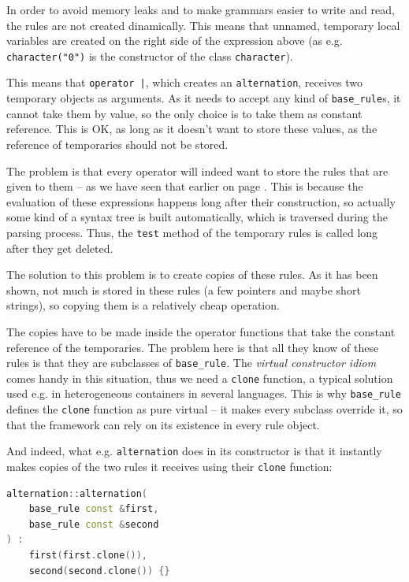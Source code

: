 \documentclass[12pt]{article}
\begin{document}
In order to avoid memory leaks and to make grammars easier to write and read, the rules are not created
dinamically. This means that unnamed, temporary local variables are created on the right side of the
expression above (as e.g. \texttt{character("0")} is the constructor of the class \texttt{character}).

This means that \texttt{operator |}, which creates an \texttt{alternation}, receives two temporary objects as
arguments. As it needs to accept any kind of \texttt{base\_rule}s, it cannot take them by value, so the only
choice is to take them as constant reference. This is OK, as long as it doesn't want to store these values, as
the reference of temporaries should not be stored.

The problem is that every operator will indeed want to store the rules that are given to them -- as we have
seen that earlier on page \pageref{subsec:ebnfoperators}. This is because the evaluation of these expressions
happens long after their construction, so actually some kind of a syntax tree is built automatically, which is
traversed during the parsing process. Thus, the \texttt{test} method of the temporary rules is called long
after they get deleted.

The solution to this problem is to create copies of these rules. As it has been shown, not much is stored in
these rules (a few pointers and maybe short strings), so copying them is a relatively cheap operation.

The copies have to be made inside the operator functions that take the constant reference of the temporaries.
The problem here is that all they know of these rules is that they are subclasses of \texttt{base\_rule}.  The
\emph{virtual constructor idiom} comes handy in this situation, thus we need a \texttt{clone} function, a typical
solution used e.g. in heterogeneous containers in several languages. This is why \texttt{base\_rule} defines
the \texttt{clone} function as pure virtual -- it makes every subclass override it, so that the framework can
rely on its existence in every rule object.

And indeed, what e.g. \texttt{alternation} does in its constructor is that it instantly makes copies of the
two rules it receives using their \texttt{clone} function: 

\begin{center}
	\begin{minipage}[h]{0.8\textwidth}
		\begin{lstlisting}[language=C++, breaklines=true]
alternation::alternation(
	base_rule const &first,
	base_rule const &second
) : 
	first(first.clone()),
	second(second.clone()) {}
		\end{lstlisting}
	\end{minipage}
\end{center}
\end{document}
